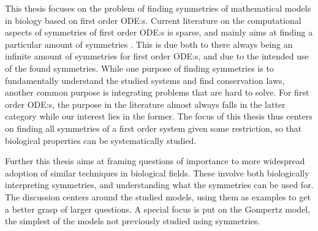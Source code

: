 This thesis focuses on the problem of finding symmetries of mathematical models in biology based on first order ODE:s.
Current literature on the computational aspects of symmetries of first order ODE:s is sparse, and mainly aims at finding a particular amount of symmetries \cite{chebterrab1997computer,chebterrab1998patterns}. %
This is due both to there always being an infinite amount of symmetries for first order ODE:s, and due to the intended use of the found symmetries.
While one purpose of finding symmetries is to fundamentally understand the studied systems and find conservation laws, another common purpose is integrating problems that are hard to solve.
For first order ODE:s, the purpose in the literature almost always falls in the latter category while our interest lies in the former. %
The focus of this thesis thus centers on finding all symmetries of a first order system given some restriction, so that biological properties can be systematically studied.

Further this thesis aims at framing questions of importance to more widespread adoption of similar techniques in biological fields.
These involve both biologically interpreting symmetries, and understanding what the symmetries can be used for.
The discussion centers around the studied models, using them as examples to get a better grasp of larger questions.
A special focus is put on the Gompertz model, the simplest of the models not previously studied using symmetries.

